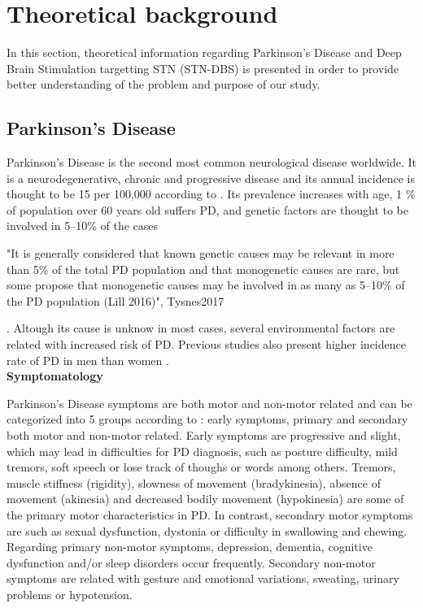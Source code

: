 
\section{Theoretical background}

In this section, theoretical information regarding Parkinson's Disease and Deep Brain Stimulation targetting STN (STN-DBS) is presented in order to provide better understanding of the problem and purpose of our study.

\subsection{Parkinson's Disease}
Parkinson's Disease is the second most common neurological disease worldwide. It is a neurodegenerative, chronic and progressive disease and its annual incidence is thought to be 15 per 100,000 according to . Its prevalence increases with age, 1 \% of population over 60 years old suffers PD, and genetic factors are thought to be involved in 5–10\% of the cases

"It is generally considered that known genetic causes may be relevant in more than 5\% of the total PD population and that monogenetic causes are rare, but some propose that monogenetic causes may be involved in as many as 5–10\% of the PD population (Lill 2016)", Tysnes2017

. Altough its cause is unknow in most cases, several environmental factors are related with increased risk of PD. Previous studies also present higher incidence rate of PD in men than women \cite{Tysnes2017, Wooten2004}. \\

\textbf{Symptomatology}

Parkinson's Disease symptoms are both motor and non-motor related and can be categorized into 5 groups according to : early symptoms, primary and secondary both motor and non-motor related. 
Early symptoms are progressive and slight, which may lead in difficulties for PD diagnosis, such as posture difficulty, mild tremors, soft speech or lose track of thoughs or words among others.  Tremors, muscle stiffness (rigidity), slowness of movement (bradykinesia), absence of  movement (akinesia) and decreased bodily movement (hypokinesia) are some of the primary motor characteristics in PD. In contrast, secondary motor symptoms are such as sexual dysfunction, dystonia or difficulty in swallowing and chewing. Regarding primary non-motor symptoms, depression, dementia, cognitive dysfunction and/or sleep disorders occur frequently. Secondary non-motor symptoms are related with gesture and emotional variations, sweating, urinary problems or hypotension. 
\\
 
